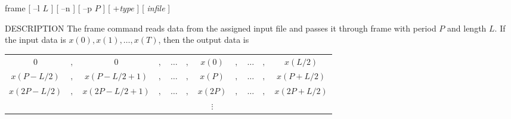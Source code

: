 % 
% 
% 
% 
%                                                                        
%

\begin{synopsis}
 \item [frame] [ --l $L$ ] [ --n ] [ --p $P$ ] [ +{\em type} ] [ {\em infile} ]
\end{synopsis}

\begin{qsection}{DESCRIPTION}
The frame command reads data from the assigned input file and
passes it through frame with period $P$ and length $L$.
If the input data is $x(0),x(1),\ldots,x(T)$, then the output data is
\begin{center}
\begin{tabular}{ccccccccccc}
$0$&$,$&$0$&$,$&$\ldots$&$,$&$x(0)$&$,$&$\ldots$&$,$&$x(L/2)$\\
$x(P-L/2)$&$,$&$x(P-L/2+1)$&$,$&$\ldots$&$,$&$x(P)$&$,$&$\ldots$&$,$&$x(P+L/2)$\\
$x(2P-L/2)$&$,$&$x(2P-L/2+1)$&$,$&$\ldots$&$,$&$x(2P)$&$,$&$\ldots$&$,$&$x(2P+L/2)$\\
&&&&&&$\vdots$&&&&
\end{tabular}
\end{center}

\end{qsection}

